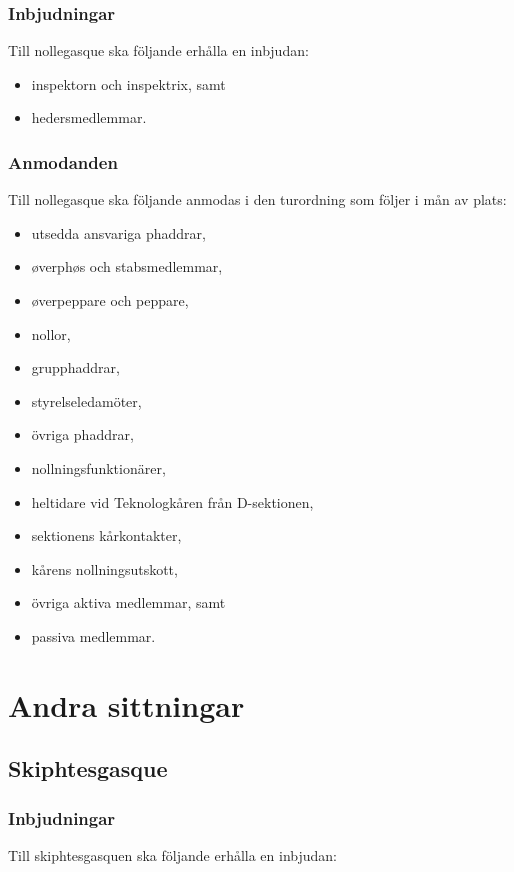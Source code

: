 \documentclass{dsekprotokoll}
\begin{document}
\subsubsection{Inbjudningar}
Till nollegasque ska följande erhålla en inbjudan:
\begin{itemize}
    \item inspektorn och inspektrix, samt
    \item hedersmedlemmar.
\end{itemize}

\subsubsection{Anmodanden}
Till nollegasque ska följande anmodas i den turordning som
följer i mån av plats:
  \begin{itemize}
    \item utsedda ansvariga phaddrar,
    \item øverphøs och stabsmedlemmar,
    \item øverpeppare och peppare,
    \item nollor,
    \item grupphaddrar,
    \item styrelseledamöter,
    \item övriga phaddrar,
    \item nollningsfunktionärer,
    \item heltidare vid Teknologkåren från D-sektionen,
    \item sektionens kårkontakter,
    \item kårens nollningsutskott,
    \item övriga aktiva medlemmar, samt
    \item passiva medlemmar.
  \end{itemize}



\section{Andra sittningar}

\subsection{Skiphtesgasque}

\subsubsection{Inbjudningar}
Till skiphtesgasquen ska följande erhålla en inbjudan:
\end{document}
